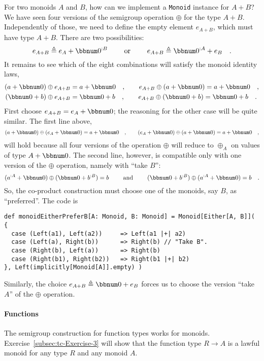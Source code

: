 For two monoids $A$ and $B$, how can we implement a \lstinline!Monoid!
instance for $A+B$? We have seen four versions of the semigroup operation
$\oplus$ for the type $A+B$. Independently of those, we need to
define the empty element $e_{A+B}$, which must have type $A+B$.
There are two possibilities: 
\[
e_{A+B}\triangleq e_{A}+\bbnum 0^{:B}\quad\quad\text{ or }\quad\quad e_{A+B}\triangleq\bbnum 0^{:A}+e_{B}\quad.
\]
It remains to see which of the eight combinations will satisfy the
monoid identity laws,
\begin{align*}
\left(a+\bbnum 0\right)\oplus e_{A+B} & =a+\bbnum 0\quad,\quad\quad e_{A+B}\oplus\left(a+\bbnum 0\right)=a+\bbnum 0\quad,\\
\left(\bbnum 0+b\right)\oplus e_{A+B} & =\bbnum 0+b\quad,\quad\quad e_{A+B}\oplus\left(\bbnum 0+b\right)=\bbnum 0+b\quad.
\end{align*}
First choose $e_{A+B}=e_{A}+\bbnum 0$; the reasoning for the other
case will be quite similar. The first line above,
\[
\left(a+\bbnum 0\right)\oplus\left(e_{A}+\bbnum 0\right)=a+\bbnum 0\quad,\quad\quad\left(e_{A}+\bbnum 0\right)\oplus\left(a+\bbnum 0\right)=a+\bbnum 0\quad,
\]
will hold because all four versions of the operation $\oplus$ will
reduce to $\oplus_{A}$ on values of type $A+\bbnum 0$. The second
line, however, is compatible only with one version of the $\oplus$
operation, namely with ``take $B$'':
\[
(a^{:A}+\bbnum 0)\oplus(\bbnum 0+b^{:B})=b\quad\quad\text{ and }\quad\quad(\bbnum 0+b^{:B})\oplus(a^{:A}+\bbnum 0)=b\quad.
\]
So, the co-product construction must choose one of the monoids, say
$B$, as ``preferred''. The code is
\begin{lstlisting}
def monoidEitherPreferB[A: Monoid, B: Monoid] = Monoid[Either[A, B]]( {
  case (Left(a1), Left(a2))     => Left(a1 |+| a2)
  case (Left(a), Right(b))      => Right(b) // "Take B".
  case (Right(b), Left(a))      => Right(b)
  case (Right(b1), Right(b2))   => Right(b1 |+| b2)
}, Left(implicitly[Monoid[A]].empty) )
\end{lstlisting}
Similarly, the choice $e_{A+B}\triangleq\bbnum 0+e_{B}$ forces us
to choose the version ``take $A$'' of the $\oplus$ operation.

\paragraph{Functions}

The semigroup construction for function types works for monoids. Exercise~\ref{subsec:tc-Exercise-3}
will show that the function type $R\rightarrow A$ is a lawful monoid
for any type $R$ and any monoid $A$.


